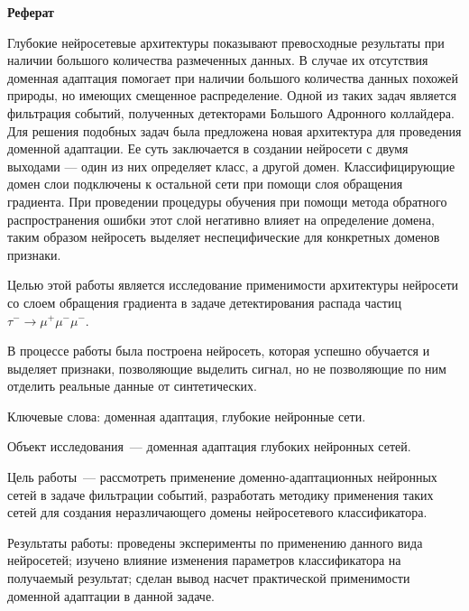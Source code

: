 \documentclass[14pt]{extarticle}
\begin{document}
\newpage

\setcounter{page}{1}
\thispagestyle{empty}

\centerline{\large \textbf{Реферат}}

\bigskip
\bigskip

Глубокие нейросетевые архитектуры показывают превосходные результаты при наличии большого количества размеченных данных. В случае их отсутствия доменная адаптация помогает при наличии большого количества данных похожей природы, но имеющих смещенное распределение.
Одной из таких задач является фильтрация событий, полученных детекторами Большого Адронного коллайдера.
Для решения подобных задач была предложена новая архитектура для проведения доменной адаптации.
Ее суть заключается в создании нейросети с двумя выходами — один из них определяет класс, а другой домен.
Классифицирующие домен слои подключены к остальной сети при помощи слоя обращения градиента.
При проведении процедуры обучения при помощи метода обратного распространения ошибки этот слой негативно влияет на определение домена, таким образом нейросеть выделяет неспецифические для конкретных доменов признаки.

Целью этой работы является исследование применимости архитектуры нейросети со слоем обращения градиента в задаче детектирования распада частиц $\tau^- \rightarrow \mu^+ \mu^- \mu^-$.

В процессе работы была построена нейросеть, которая успешно обучается и выделяет признаки, позволяющие выделить сигнал, но не позволяющие по ним отделить реальные данные от синтетических.


\medskip

\noindent
Ключевые слова: доменная адаптация, глубокие нейронные сети.

\medskip 

\noindent
Объект исследования~— доменная адаптация глубоких нейронных сетей.

\medskip 

\noindent
Цель работы~— рассмотреть применение доменно-адаптационных нейронных сетей в задаче фильтрации событий, разработать методику применения таких сетей для создания неразличающего домены нейросетевого классификатора.

\medskip 

\noindent
Результаты работы: проведены эксперименты по применению данного вида нейросетей; изучено влияние изменения параметров классификатора на получаемый результат; сделан вывод насчет практической применимости доменной адаптации в данной задаче.
\end{document}

